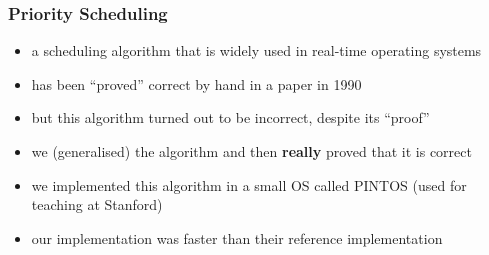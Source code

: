 \documentclass[dvipsnames,14pt,t]{beamer}
\begin{document}
  
  \begin{frame}[c]
  \frametitle{Priority Scheduling}

  \begin{itemize}
  \item a scheduling algorithm that is widely used in real-time operating systems
  \item has been ``proved'' correct by hand in a paper in 1990
  \item but this algorithm turned out to be incorrect, despite its ``proof''\bigskip\pause
  
  \item we (generalised) the algorithm and then {\bf really} proved that it is correct	
  \item we implemented this algorithm in a small OS called PINTOS (used for teaching at Stanford)
  \item our implementation was faster than their reference implementation
  \end{itemize}

  \end{frame}
   
\end{document}
